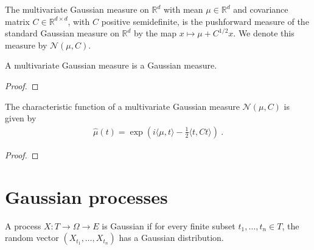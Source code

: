 \begin{definition}\label{def:multivariateGaussian}
The multivariate Gaussian measure on $\mathbb{R}^d$ with mean $\mu \in \mathbb{R}^d$ and covariance matrix $C \in \mathbb{R}^{d \times d}$, with $C$ positive semidefinite, is the pushforward measure of the standard Gaussian measure on $\mathbb{R}^d$ by the map $x \mapsto \mu + C^{1/2} x$.
We denote this measure by $\mathcal{N}(\mu, C)$.
\end{definition}


\begin{lemma}\label{lem:isGaussian_multivariateGaussian}
A multivariate Gaussian measure is a Gaussian measure.
\end{lemma}

\begin{proof}

\end{proof}


\begin{theorem}\label{thm:charFun_multivariateGaussian}
The characteristic function of a multivariate Gaussian measure $\mathcal{N}(\mu, C)$ is given by
\begin{align*}
  \hat{\mu}(t) = \exp\left(i \langle \mu, t \rangle - \frac{1}{2} \langle t, C t \rangle\right)
  \: .
\end{align*}
\end{theorem}

\begin{proof}

\end{proof}


\section{Gaussian processes}
\label{sec:gaussian_processes}

\begin{definition}\label{def:IsGaussianProcess}
A process $X : T \to \Omega \to E$ is Gaussian if for every finite subset $t_1, \ldots, t_n \in T$, the random vector $(X_{t_1}, \ldots, X_{t_n})$ has a Gaussian distribution.
\end{definition}

